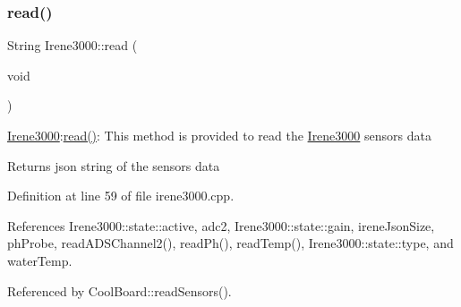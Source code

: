 \subsubsection{\texorpdfstring{read()}{read()}}
{\footnotesize\ttfamily String Irene3000\+::read (\begin{DoxyParamCaption}\item[{void}]{ }\end{DoxyParamCaption})}

\hyperlink{classIrene3000}{Irene3000}\+:\hyperlink{classIrene3000_a852a170feea994ea1df01c6b245b5d9a}{read()}\+: This method is provided to read the \hyperlink{classIrene3000}{Irene3000} sensors data

\begin{DoxyReturn}{Returns}
json string of the sensors data 
\end{DoxyReturn}


Definition at line 59 of file irene3000.\+cpp.



References Irene3000\+::state\+::active, adc2, Irene3000\+::state\+::gain, irene\+Json\+Size, ph\+Probe, read\+A\+D\+S\+Channel2(), read\+Ph(), read\+Temp(), Irene3000\+::state\+::type, and water\+Temp.



Referenced by Cool\+Board\+::read\+Sensors().


